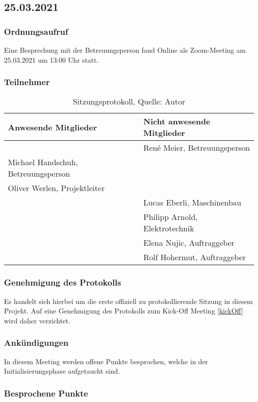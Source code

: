 \subsection{25.03.2021}\label{Beteuermeeting2}
\subsubsection{Ordnungsaufruf}
Eine Besprechung mit der Betreuungsperson fand Online als Zoom-Meeting am 25.03.2021 um 13:00 Uhr statt. 
\subsubsection{Teilnehmer}
\begin{table}[H]
	\setlength\extrarowheight{2pt} %
	\begin{tabularx}{\textwidth}{|X|X|}
		\hline
		\textbf{Anwesende Mitglieder} &  \textbf{Nicht anwesende Mitglieder} \\
		\hline
		& René Meier, Betreuungsperson  \\
		 Michael Handschuh, Betreuungsperson &   \\
		Oliver Werlen, Projektleiter &\\
		&Lucas Eberli, Maschinenbau  \\
		&Philipp Arnold, Elektrotechnik \\
		&Elena Nujic, Auftraggeber \\
		&Rolf Hohermut, Auftraggeber \\
		\hline
	\end{tabularx}
	\caption{ \label{tbl: Teilnehmerliste vom 25.03.2021}Sitzungsprotokoll, Quelle: Autor}
\end{table}
\subsubsection{Genehmigung des Protokolls}
Es handelt sich hierbei um die erste offiziell zu protokollierende Sitzung in diesem Projekt. Auf eine Genehmigung des Protokolls zum Kick-Off Meeting \ref{kickOff} wird daher verzichtet. 
\subsubsection{Ankündigungen}
In diesem Meeting werden offene Punkte besprochen, welche in der Initialisierungsphase aufgetaucht sind. 
\subsubsection{Besprochene Punkte}
